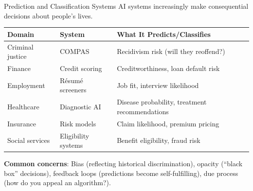 \documentclass[aspectratio=169,11pt]{beamer}
\begin{document}
\begin{frame}{Prediction and Classification Systems}
AI systems increasingly make consequential decisions about people's lives.

\vspace{0.2em}
\begin{table}[h]
\centering
\scriptsize
\begin{tabular}{@{}p{2.3cm}p{3cm}p{6.5cm}@{}}
\toprule
\textbf{Domain} & \textbf{System} & \textbf{What It Predicts/Classifies} \\
\midrule
Criminal justice & COMPAS & Recidivism risk (will they reoffend?) \\
Finance & Credit scoring & Creditworthiness, loan default risk \\
Employment & Résumé screeners & Job fit, interview likelihood \\
Healthcare & Diagnostic AI & Disease probability, treatment recommendations \\
Insurance & Risk models & Claim likelihood, premium pricing \\
Social services & Eligibility systems & Benefit eligibility, fraud risk \\
\bottomrule
\end{tabular}
\end{table}

\vspace{0.2em}
\textbf{Common concerns}: Bias (reflecting historical discrimination), opacity (``black box'' decisions), feedback loops (predictions become self-fulfilling), due process (how do you appeal an algorithm?).
\end{frame}
\end{document}
